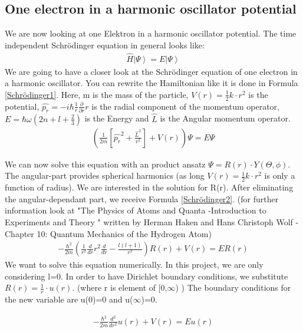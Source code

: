 \documentclass[10pt,a4paper]{article}
\begin{document}
\subsection{One electron in a harmonic oscillator potential \label{one electron in harm osc}}
We are now looking at one Elektron in a harmonic oscillator potential. 
The time independent Schrödinger equation in general looks like:
\begin{align}
	\hat{H} \left|\Psi \right> = E \left|\Psi \right>
\end{align}
We are going to have a closer look at the Schrödinger equation of one electron in a harmonic oscillator. 
You can rewrite the Hamiltonian like it is done in Formula \ref{Schrödinger1}. Here, m is the mass of the particle, $V(r)=\frac{1}{2}k \cdot r^2$ is the potential, $\hat{p_r}=-i \hbar \frac{1}{r} \frac{\partial}{\partial r} r$ is the radial component of the momentum operator, $E=\hbar \omega (2n+l+\frac{2}{3})$ is the Energy and $\hat{L}$ is the Angular momentum operator. 
\begin{align}
	\left( \frac{1}{2m} \left[ \hat{p_r}^2 + \frac{\hat{L}^2}{r^2}\right] +V(r) \right) \Psi = E \Psi \label{Schrödinger1}
\end{align}

We can now solve this equation with an product ansatz $\Psi= R(r) \cdot Y(\Theta, \phi )$. The angular-part provides spherical harmonics (as long $V(r)=\frac{1}{2}k \cdot r^2$ is only a function of radius). We are interested in the solution for R(r). After eliminating the angular-dependant part, we receive Formula \ref{Schrödinger2}. (for further information look at "The Physics of Atoms and Quanta -Introduction to Experiments and Theory " written by Herman Haken and Hans Christoph Wolf - Chapter 10: Quantum Mechanics of the Hydrogen Atom)
\begin{align}
	-\frac{\hbar^2}{2 m} \left( \frac{1}{r^2} \frac{d}{dr}r^2 \frac{d}{dr}-\frac{l(l+1)}{r^2} \right) R(r)+ V(r) = E R(r) \label{Schrödinger2}
\end{align}
We want to solve this equation numerically. In this project, we are only considering l=0.
In order to have Dirichlet boundary conditions, we substitute $R(r)=\frac{1}{r}\cdot u(r)$. (where r is element of [0,$\infty$)  ) The boundary conditions for the new variable are u(0)=0 and u($\infty$)=0. 

\begin{align}
	-\frac{\hbar^2}{2 m}  \frac{d^2}{dr^2} u(r)+ V(r) = E u(r) \label{Schrödinger3}
\end{align}
\end{document}
